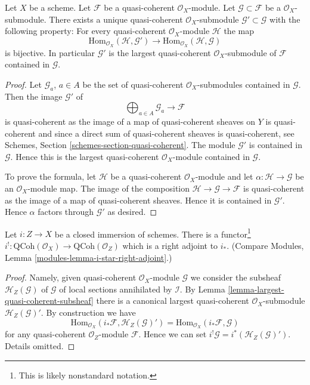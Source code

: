 \begin{lemma}
\label{lemma-largest-quasi-coherent-subsheaf}
Let $X$ be a scheme. Let $\mathcal{F}$ be a quasi-coherent
$\mathcal{O}_X$-module. Let $\mathcal{G} \subset \mathcal{F}$
be a $\mathcal{O}_X$-submodule. There exists a unique quasi-coherent
$\mathcal{O}_X$-submodule $\mathcal{G}' \subset \mathcal{G}$
with the following property: For every quasi-coherent $\mathcal{O}_X$-module
$\mathcal{H}$ the map
$$
\text{Hom}_{\mathcal{O}_X}(\mathcal{H}, \mathcal{G}')
\longrightarrow
\text{Hom}_{\mathcal{O}_X}(\mathcal{H}, \mathcal{G})
$$
is bijective. In particular $\mathcal{G}'$ is the largest quasi-coherent
$\mathcal{O}_X$-submodule of $\mathcal{F}$ contained in $\mathcal{G}$.
\end{lemma}

\begin{proof}
Let $\mathcal{G}_a$, $a \in A$ be the set of quasi-coherent
$\mathcal{O}_X$-submodules contained in $\mathcal{G}$.
Then the image $\mathcal{G}'$ of
$$
\bigoplus\nolimits_{a \in A} \mathcal{G}_a \longrightarrow \mathcal{F}
$$
is quasi-coherent as the image of a map of quasi-coherent sheaves
on $Y$ is quasi-coherent and since a direct sum of quasi-coherent sheaves
is quasi-coherent, see
Schemes, Section \ref{schemes-section-quasi-coherent}.
The module $\mathcal{G}'$ is contained in $\mathcal{G}$. Hence this is the
largest quasi-coherent $\mathcal{O}_X$-module contained in $\mathcal{G}$.

\medskip\noindent
To prove the formula, let $\mathcal{H}$ be a quasi-coherent
$\mathcal{O}_X$-module and let $\alpha : \mathcal{H} \to \mathcal{G}$
be an $\mathcal{O}_X$-module map. The image of the composition
$\mathcal{H} \to \mathcal{G} \to \mathcal{F}$ is quasi-coherent
as the image of a map of quasi-coherent sheaves. Hence it is contained
in $\mathcal{G}'$. Hence $\alpha$ factors through $\mathcal{G}'$
as desired.
\end{proof}

\begin{lemma}
\label{lemma-i-upper-shriek}
Let $i : Z \to X$ be a closed immersion of schemes.
There is a functor\footnote{This is likely nonstandard notation.}
$i^! : \text{QCoh}(\mathcal{O}_X) \to \text{QCoh}(\mathcal{O}_Z)$
which is a right adjoint to $i_*$. (Compare
Modules, Lemma \ref{modules-lemma-i-star-right-adjoint}.)
\end{lemma}

\begin{proof}
Namely, given quasi-coherent $\mathcal{O}_X$-module $\mathcal{G}$ we consider
the subsheaf $\mathcal{H}_Z(\mathcal{G})$ of $\mathcal{G}$ of local sections
annihilated by $\mathcal{I}$. By
Lemma \ref{lemma-largest-quasi-coherent-subsheaf}
there is a canonical largest quasi-coherent $\mathcal{O}_X$-submodule
$\mathcal{H}_Z(\mathcal{G})'$. By construction we have
$$
\text{Hom}_{\mathcal{O}_X}(i_*\mathcal{F}, \mathcal{H}_Z(\mathcal{G})')
=
\text{Hom}_{\mathcal{O}_X}(i_*\mathcal{F}, \mathcal{G})
$$
for any quasi-coherent $\mathcal{O}_Z$-module $\mathcal{F}$.
Hence we can set $i^!\mathcal{G} = i^*(\mathcal{H}_Z(\mathcal{G})')$.
Details omitted.
\end{proof}





